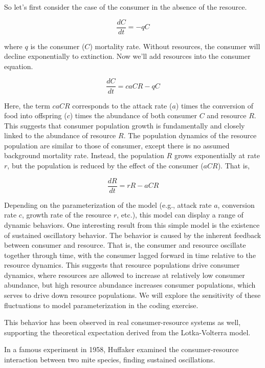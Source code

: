 \documentclass[12pt]{article}
\begin{document}
So let's first consider the case of the consumer in the absence of the resource. 

\begin{equation}
\frac{dC}{dt} = -qC
\end{equation}

where $q$ is the consumer ($C$) mortality rate. Without resources, the consumer will decline exponentially to extinction. Now we'll add resources into the consumer equation.


\begin{equation}
\frac{dC}{dt} = caCR - qC
\end{equation}


Here, the term $caCR$ corresponds to the attack rate ($a$) times the conversion of food into offspring ($c$) times the abundance of both consumer $C$ and resource $R$. This suggests that consumer population growth is fundamentally and closely linked to the abundance of resource $R$. The population dynamics of the resource population are similar to those of consumer, except there is no assumed background mortality rate. Instead, the population $R$ grows exponentially at rate $r$, but the population is reduced by the effect of the consumer ($aCR$). That is, 


\begin{equation}
\frac{dR}{dt} = rR - aCR
\end{equation}


Depending on the parameterization of the model (e.g., attack rate $a$, conversion rate $c$, growth rate of the resource $r$, etc.), this model can display a range of dynamic behaviors. One interesting result from this simple model is the existence of sustained oscillatory behavior. The behavior is caused by the inherent feedback between consumer and resource. That is, the consumer and resource oscillate together through time, with the consumer lagged forward in time relative to the resource dynamics. This suggests that resource populations drive consumer dynamics, where resources are allowed to increase at relatively low consumer abundance, but high resource abundance increases consumer populations, which serves to drive down resource populations. We will explore the sensitivity of these fluctuations to model parameterization in the coding exercise. 


This behavior has been observed in real consumer-resource systems as well, supporting the theoretical expectation derived from the Lotka-Volterra model. 

In a famous experiment in 1958, Huffaker examined the consumer-resource interaction between two mite species, finding sustained oscillations. 
\end{document}
